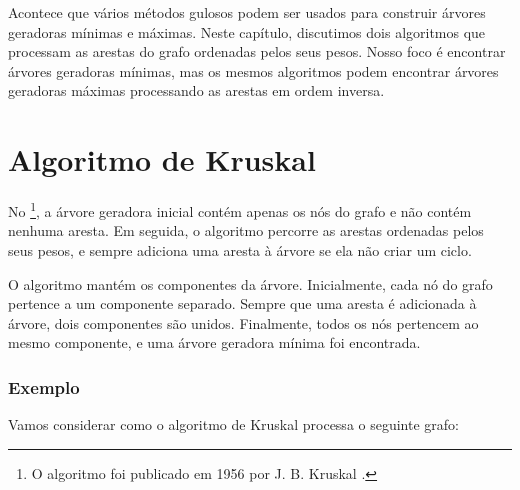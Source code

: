 Acontece que vários métodos gulosos
podem ser usados para construir árvores geradoras
mínimas e máximas.
Neste capítulo, discutimos dois algoritmos
que processam
as arestas do grafo ordenadas pelos seus pesos.
Nosso foco é encontrar árvores geradoras mínimas,
mas os mesmos algoritmos podem encontrar
árvores geradoras máximas processando as arestas em ordem inversa.

\section{Algoritmo de Kruskal}


No \footnote{O algoritmo foi publicado em 1956
por J. B. Kruskal \cite{kru56}.}, a árvore geradora inicial
contém apenas os nós do grafo
e não contém nenhuma aresta.
Em seguida, o algoritmo percorre as arestas
ordenadas pelos seus pesos, e sempre adiciona uma aresta
à árvore se ela não criar um ciclo.

O algoritmo mantém os componentes
da árvore.
Inicialmente, cada nó do grafo
pertence a um componente separado.
Sempre que uma aresta é adicionada à árvore,
dois componentes são unidos.
Finalmente, todos os nós pertencem ao mesmo componente,
 e uma árvore geradora mínima foi encontrada.

\subsubsection{Exemplo}

\begin{samepage}
Vamos considerar como o algoritmo de Kruskal processa o
seguinte grafo:
\begin{center}
\end{center}
\end{samepage}

